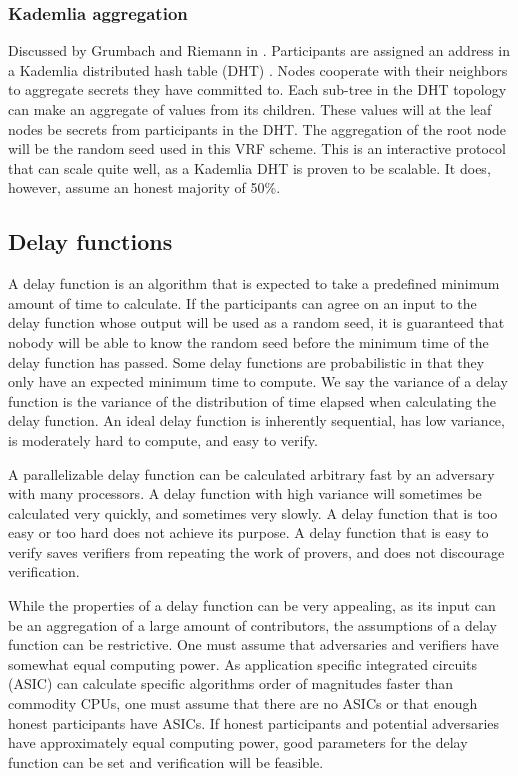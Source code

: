 \subsubsection{Kademlia aggregation}
Discussed by Grumbach and Riemann in \cite{grumbach_distributed_2017}. Participants are assigned an address in a Kademlia distributed hash table (DHT) \cite{maymounkov2002kademlia}. Nodes cooperate with their neighbors to aggregate secrets they have committed to. Each sub-tree in the DHT topology can make an aggregate of values from its children. These values will at the leaf nodes be secrets from participants in the DHT. The aggregation of the root node will be the random seed used in this VRF scheme. 
This is an interactive protocol that can scale quite well, as a Kademlia DHT is proven to be scalable. It does, however, assume an honest majority of 50\%. 

\subsection{Delay functions}
A delay function is an algorithm that is expected to take a predefined minimum amount of time to calculate. If the participants can agree on an input to the delay function whose output will be used as a random seed, it is guaranteed that nobody will be able to know the random seed before the minimum time of the delay function has passed. Some delay functions are probabilistic in that they only have an expected minimum time to compute. We say the variance of a delay function is the variance of the distribution of time elapsed when calculating the delay function. An ideal delay function is inherently sequential, has low variance, is moderately hard to compute, and easy to verify.

A parallelizable delay function can be calculated arbitrary fast by an adversary with many processors. A delay function with high variance will sometimes be calculated very quickly, and sometimes very slowly. A delay function that is too easy or too hard does not achieve its purpose. A delay function that is easy to verify saves verifiers from repeating the work of provers, and does not discourage verification.

While the properties of a delay function can be very appealing, as its input can be an aggregation of a large amount of contributors, the assumptions of a delay function can be restrictive. One must assume that adversaries and verifiers have somewhat equal computing power. As application specific integrated circuits (ASIC) can calculate specific algorithms order of magnitudes faster than commodity CPUs, one must assume that there are no ASICs or that enough honest participants have ASICs. If honest participants and potential adversaries have approximately equal computing power, good parameters for the delay function can be set and verification will be feasible.

